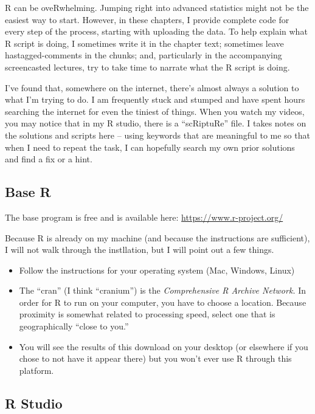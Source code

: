 \documentclass[
  english,
]{book}
\providecommand{\tightlist}{%
  \setlength{\itemsep}{0pt}\setlength{\parskip}{0pt}}
\begin{document}
R can be oveRwhelming. Jumping right into advanced statistics might not be the easiest way to start. However, in these chapters, I provide complete code for every step of the process, starting with uploading the data. To help explain what R script is doing, I sometimes write it in the chapter text; sometimes leave hastagged-comments in the chunks; and, particularly in the accompanying screencasted lectures, try to take time to narrate what the R script is doing.

I've found that, somewhere on the internet, there's almost always a solution to what I'm trying to do. I am frequently stuck and stumped and have spent hours searching the internet for even the tiniest of things. When you watch my videos, you may notice that in my R studio, there is a ``scRiptuRe'' file. I takes notes on the solutions and scripts here -- using keywords that are meaningful to me so that when I need to repeat the task, I can hopefully search my own prior solutions and find a fix or a hint.

\hypertarget{base-r}{%
\subsection{Base R}\label{base-r}}

The base program is free and is available here: \url{https://www.r-project.org/}

Because R is already on my machine (and because the instructions are sufficient), I will not walk through the instllation, but I will point out a few things.

\begin{itemize}
\tightlist
\item
  Follow the instructions for your operating system (Mac, Windows, Linux)
\item
  The ``cran'' (I think ``cranium'') is the \emph{Comprehensive R Archive Network.} In order for R to run on your computer, you have to choose a location. Because proximity is somewhat related to processing speed, select one that is geographically ``close to you.''
\item
  You will see the results of this download on your desktop (or elsewhere if you chose to not have it appear there) but you won't ever use R through this platform.
\end{itemize}

\hypertarget{r-studio}{%
\subsection{R Studio}\label{r-studio}}
\end{document}
